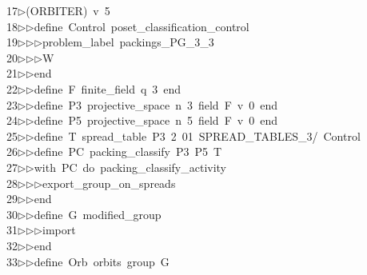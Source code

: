 \begin{tabbing}
17\>$\triangleright$\>(ORBITER)\ v\ 5\ \\[0pt]
18\>$\triangleright$\>$\triangleright$\>define\ Control\ poset\_classification\_control\ \\[0pt]
19\>$\triangleright$\>$\triangleright$\>$\triangleright$\>problem\_label\ packings\_PG\_3\_3\ \\[0pt]
20\>$\triangleright$\>$\triangleright$\>$\triangleright$\>W\ \\[0pt]
21\>$\triangleright$\>$\triangleright$\>end\ \\[0pt]
22\>$\triangleright$\>$\triangleright$\>define\ F\ finite\_field\ q\ 3\ end\ \\[0pt]
23\>$\triangleright$\>$\triangleright$\>define\ P3\ projective\_space\ n\ 3\ field\ F\ v\ 0\ end\ \\[0pt]
24\>$\triangleright$\>$\triangleright$\>define\ P5\ projective\_space\ n\ 5\ field\ F\ v\ 0\ end\ \\[0pt]
25\>$\triangleright$\>$\triangleright$\>define\ T\ spread\_table\ P3\ 2\ 01\ SPREAD\_TABLES\_3/\ Control\ \\[0pt]
26\>$\triangleright$\>$\triangleright$\>define\ PC\ packing\_classify\ P3\ P5\ T\ \\[0pt]
27\>$\triangleright$\>$\triangleright$\>with\ PC\ do\ packing\_classify\_activity\ \\[0pt]
28\>$\triangleright$\>$\triangleright$\>$\triangleright$\>export\_group\_on\_spreads\ \\[0pt]
29\>$\triangleright$\>$\triangleright$\>end\ \\[0pt]
30\>$\triangleright$\>$\triangleright$\>define\ G\ modified\_group\ \\[0pt]
31\>$\triangleright$\>$\triangleright$\>$\triangleright$\>import\ \\[0pt]
32\>$\triangleright$\>$\triangleright$\>end\ \\[0pt]
33\>$\triangleright$\>$\triangleright$\>define\ Orb\ orbits\ group\ G\ \\[0pt]

\end{tabbing}

